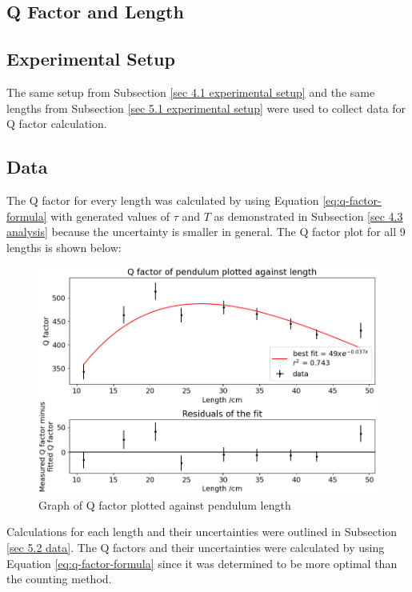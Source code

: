 \documentclass[11pt]{article}
\begin{document}
\begin{multicols}{2}
\section{Q Factor and Length}

\subsection{Experimental Setup}
The same setup from Subsection \ref{sec 4.1 experimental setup} and the same lengths from Subsection \ref{sec 5.1 experimental setup} were used to collect data for Q factor calculation.

\subsection{Data}
The Q factor for every length was calculated by using Equation \ref{eq:q-factor-formula} with generated values of $\tau$ and $T$ as demonstrated in Subsection \ref{sec 4.3 analysis} because the uncertainty is smaller in general. The Q factor plot for all 9 lengths is shown below:

\begin{figure}[H]
    \centering
    \includegraphics[width=\linewidth]{../figures/qfactor_vs_length.png}
    \caption{\centering Graph of Q factor plotted against pendulum length}
    \label{fig:figure 8}
\end{figure}

Calculations for each length and their uncertainties were outlined in Subsection \ref{sec 5.2 data}. The Q factors and their uncertainties were calculated by using Equation \ref{eq:q-factor-formula} since it was determined to be more optimal than the counting method.


\end{multicols}
\end{document}
